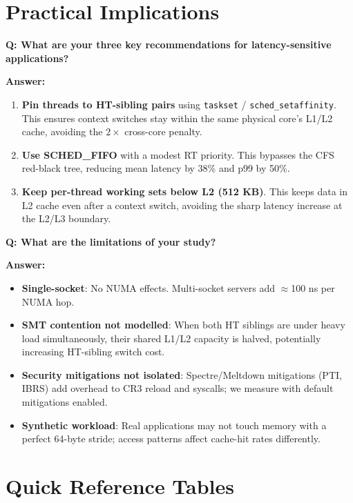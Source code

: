 \documentclass[12pt,a4paper]{article}
\newcommand{\Q}[1]{\begin{mdframed}[style=qbox]
\textbf{\textcolor{qcol}{Q: #1}}\end{mdframed}\vspace{2pt}}
\newcommand{\A}[1]{\begin{mdframed}[style=abox]
\textbf{\textcolor{acol}{Answer:}} #1\end{mdframed}\vspace{10pt}}
\begin{document}
\section{Practical Implications}

\Q{What are your three key recommendations for latency-sensitive applications?}
\A{\begin{enumerate}[nosep]
  \item \textbf{Pin threads to HT-sibling pairs} using \texttt{taskset} / \texttt{sched\_setaffinity}. This ensures context switches stay within the same physical core's L1/L2 cache, avoiding the $2\times$ cross-core penalty.
  \item \textbf{Use SCHED\_FIFO} with a modest RT priority. This bypasses the CFS red-black tree, reducing mean latency by 38\% and p99 by 50\%.
  \item \textbf{Keep per-thread working sets below L2 (512 KB)}. This keeps data in L2 cache even after a context switch, avoiding the sharp latency increase at the L2/L3 boundary.
\end{enumerate}}

\Q{What are the limitations of your study?}
\A{\begin{itemize}[nosep]
  \item \textbf{Single-socket}: No NUMA effects. Multi-socket servers add $\approx$100 ns per NUMA hop.
  \item \textbf{SMT contention not modelled}: When both HT siblings are under heavy load simultaneously, their shared L1/L2 capacity is halved, potentially increasing HT-sibling switch cost.
  \item \textbf{Security mitigations not isolated}: Spectre/Meltdown mitigations (PTI, IBRS) add overhead to CR3 reload and syscalls; we measure with default mitigations enabled.
  \item \textbf{Synthetic workload}: Real applications may not touch memory with a perfect 64-byte stride; access patterns affect cache-hit rates differently.
\end{itemize}}

\section{Quick Reference Tables}
\end{document}
